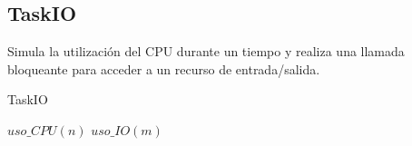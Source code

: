 \subsection{TaskIO}

Simula la utilizaci\'on del CPU durante un tiempo y realiza una llamada bloqueante para acceder a un recurso de entrada/salida.

\begin{algorithm}
 \caption{TaskIO}
 \begin{algorithmic}[1]
   \State $uso\_CPU(n)$ 
   \State $uso\_IO(m)$ 
 \EndProcedure
 \end{algorithmic}
\end{algorithm}